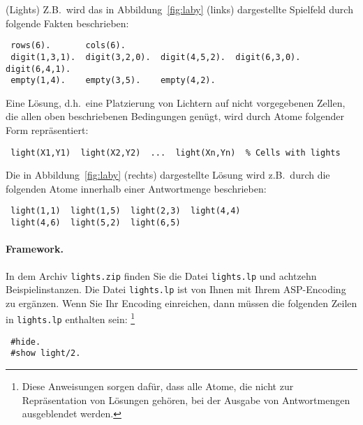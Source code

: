 \documentclass[a4paper,12pt,ngerman]{article}
\begin{document}
\begin{PraktikumsAufgabe}{1}{(Lights)}
\noindent
Z.B.\ wird das in Abbildung~\ref{fig:laby} (links) dargestellte Spielfeld %
durch folgende Fakten beschrieben:
\vspace{-1mm}
\begin{verbatim}
 rows(6).       cols(6).
 digit(1,3,1).  digit(3,2,0).  digit(4,5,2).  digit(6,3,0).  digit(6,4,1).
 empty(1,4).    empty(3,5).    empty(4,2).
\end{verbatim}
Eine Lösung, d.h.\ eine Platzierung von Lichtern auf nicht vorgegebenen
Zellen, die allen oben beschriebenen Bedingungen gen\"ugt,
wird durch Atome folgender Form repräsentiert:%
\vspace{-1mm}
\begin{verbatim}
 light(X1,Y1)  light(X2,Y2)  ...  light(Xn,Yn)  % Cells with lights
\end{verbatim}
Die in Abbildung~\ref{fig:laby} (rechts) dargestellte Lösung wird z.B.\
durch die folgenden Atome innerhalb einer Antwortmenge beschrieben:
\vspace{-1mm}
\begin{verbatim}
 light(1,1)  light(1,5)  light(2,3)  light(4,4) 
 light(4,6)  light(5,2)  light(6,5) 
\end{verbatim}

\paragraph{Framework.}

\noindent
In dem Archiv \texttt{lights.zip} finden Sie die Datei \texttt{lights.lp} und achtzehn Beispielinstanzen.
Die Datei \texttt{lights.lp} ist von Ihnen mit Ihrem ASP-Encoding zu ergänzen.
Wenn Sie Ihr Encoding einreichen,
dann müssen die folgenden Zeilen in \texttt{lights.lp} enthalten sein:
\footnote{Diese Anweisungen sorgen dafür, dass alle Atome, die nicht zur Repräsentation von Lösungen gehören, bei der Ausgabe von Antwortmengen ausgeblendet werden.}
\vspace{-1mm}
\begin{verbatim}
 #hide.
 #show light/2.
\end{verbatim}


\end{PraktikumsAufgabe}
\end{document}

